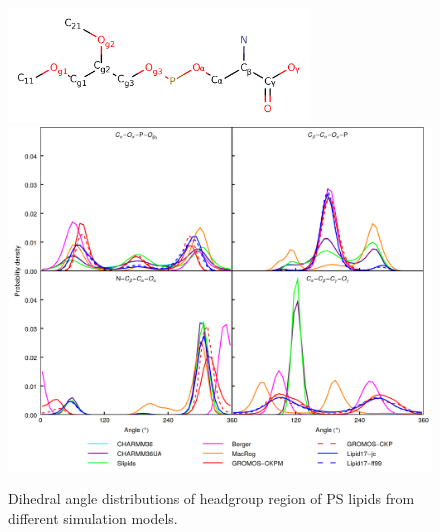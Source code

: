 \documentclass[journal=jpcbfk]{achemso}
\begin{document}
\begin{figure}[]
  \centering
  \includegraphics[width=8.0cm]{../Figs/PS_Labels.png}
  \includegraphics[width=16.0cm]{../Figs/figS7.png}
  \caption{\label{dihedralsHG}
    Dihedral angle distributions of headgroup region of PS lipids from different simulation models.
  }
\end{figure}
\end{document}
